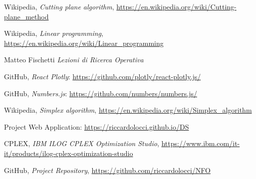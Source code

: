 \documentclass[9pt]{extarticle}
\begin{document}
    \begin{thebibliography}{7}

        Wikipedia,
        \textit{Cutting plane algorithm},
        \url{https://en.wikipedia.org/wiki/Cutting-plane_method}

        Wikipedia,
        \textit{Linear programming},
        \url{https://en.wikipedia.org/wiki/Linear_programming}

        Matteo Fischetti
        \textit{ Lezioni di Ricerca Operativa }

        GitHub,
        \textit{React Plotly}:
        \url{https://github.com/plotly/react-plotly.js/}

        GitHub,
        \textit{Numbers.js}:
        \url{https://github.com/numbers/numbers.js/}

        Wikipedia,
        \textit{Simplex algorithm},
        \url{https://en.wikipedia.org/wiki/Simplex_algorithm}

        Project Web Application: \url{https://riccardolocci.github.io/DS}
        
        CPLEX,
        \textit{IBM ILOG CPLEX Optimization Studio},
        \url{https://www.ibm.com/it-it/products/ilog-cplex-optimization-studio}

        GitHub,
        \textit{Project Repository},
        \url{https://github.com/riccardolocci/NFO}

    \end{thebibliography}
\end{document}
